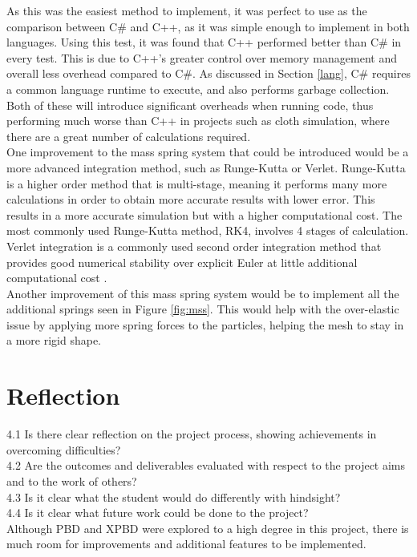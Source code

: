 \documentclass[12pt,a4paper]{article}
\begin{document}
As this was the easiest method to implement, it was perfect to use as the comparison between C\# and C++, as it was simple enough to implement in both languages. Using this test, it was found that C++ performed better than C\# in every test. This is due to C++'s greater control over memory management and overall less overhead compared to C\#. As discussed in Section \ref{lang}, C\# requires a common language runtime to execute, and also performs garbage collection. Both of these will introduce significant overheads when running code, thus performing much worse than C++ in projects such as cloth simulation, where there are a great number of calculations required.
\\

One improvement to the mass spring system that could be introduced would be a more advanced integration method, such as Runge-Kutta or Verlet. Runge-Kutta is a higher order method that is multi-stage, meaning it performs many more calculations in order to obtain more accurate results with lower error. This results in a more accurate simulation but with a higher computational cost. The most commonly used Runge-Kutta method, RK4, involves 4 stages of calculation. Verlet integration is a commonly used second order integration method that provides good numerical stability over explicit Euler at little additional computational cost \cite{gould2007introduction}. 
\\

Another improvement of this mass spring system would be to implement all the additional springs seen in Figure \ref{fig:mss}. This would help with the over-elastic issue by applying more spring forces to the particles, helping the mesh to stay in a more rigid shape.

\section{Reflection}
4.1 Is there clear reflection on the project process, showing achievements in overcoming difficulties?\\
4.2 Are the outcomes and deliverables evaluated with respect to the project aims and to the work of others?\\
4.3 Is it clear what the student would do differently with hindsight?\\
4.4 Is it clear what future work could be done to the project? \\

Although PBD and XPBD were explored to a high degree in this project, there is much room for improvements and additional features to be implemented. 
\end{document}
